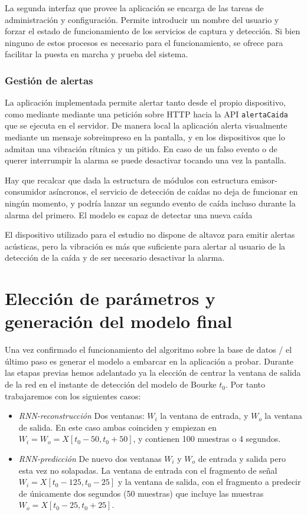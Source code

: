 La segunda interfaz que provee la aplicación se encarga de las tareas de administración y configuración. Permite introducir un nombre del usuario y forzar el estado de funcionamiento de los servicios de captura y detección. Si bien ninguno de estos procesos es necesario para el funcionamiento, se ofrece para facilitar la puesta en marcha y prueba del sistema.

\subsubsection{Gestión de alertas}

La aplicación implementada permite alertar tanto desde el propio dispositivo, como mediante mediante una petición sobre HTTP hacia la API \texttt{alertaCaida} que se ejecuta en el servidor. De manera local la aplicación alerta visualmente mediante un mensaje sobreimpreso en la pantalla, y en los dispositivos que lo admitan una vibración rítmica y un pitido. En caso de un falso evento o de querer interrumpir la alarma se puede desactivar tocando una vez la pantalla. 

Hay que recalcar que dada la estructura de módulos con estructura emisor-consumidor asíncronos, el servicio de detección de caídas no deja de funcionar en ningún momento, y podría lanzar un segundo evento de caída incluso durante la alarma del primero. El modelo es capaz de detectar una nueva caída 

El dispositivo utilizado para el estudio no dispone de altavoz para emitir alertas acústicas, pero la vibración es más que suficiente para alertar al usuario de la detección de la caída y de ser necesario desactivar la alarma.






\section{Elección de parámetros y generación del modelo final}

Una vez confirmado el funcionamiento del algoritmo sobre la base de datos \ifell/ el último paso es generar el modelo a embarcar en la aplicación a probar. Durante las etapas previas hemos adelantado ya la elección de centrar la ventana de salida de la red en el instante de detección del modelo de Bourke $t_0$. Por tanto trabajaremos con los siguientes casos:
  \begin{itemize}
    \item \textit{RNN-reconstrucción} Dos ventanas: $W_i$ la ventana de entrada, y $W_o$ la ventana de salida. En este caso ambas coinciden y empiezan en $W_i=W_o=X[t_0-50, t_0+50]$, y contienen 100 muestras o 4 segundos.
    \item \textit{RNN-predicción} De nuevo dos ventanas $W_i$ y $W_o$ de entrada y salida pero esta vez no solapadas. La ventana de entrada con el fragmento de señal $W_i=X[t_0-125,t_0-25]$ y la ventana de salida, con el fragmento a predecir de únicamente dos segundos (50 muestras) que incluye las muestras $W_o=X[t_0-25, t_0+25]$.
  \end{itemize}

